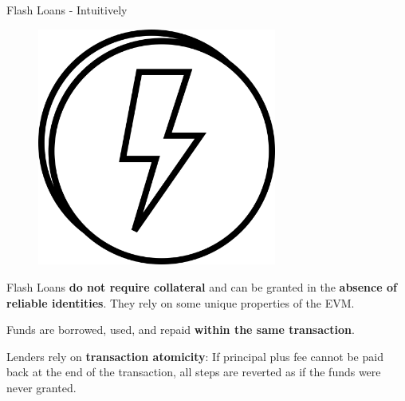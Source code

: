 \documentclass[handout]{beamer}
\begin{document}
\begin{frame}{Flash Loans - Intuitively}

\begin{minipage}{0.3\textwidth}
	\begin{figure}
		\includegraphics[width=0.7\textwidth]{../assets/images/flashloan}	
	\end{figure}
\end{minipage}
\begin{minipage}{0.65\textwidth}
Flash Loans \textbf{do not require collateral} and can be granted in the \textbf{absence of reliable identities}. They rely on some unique properties of the EVM.
\end{minipage}

\vspace{2em}

 {
\begin{minipage}{0.6\textwidth}

	Funds are borrowed, used, and repaid \textbf{within the same transaction}.

	\vspace{1em}
	Lenders rely on \textbf{transaction atomicity}: If principal plus fee cannot be paid back at the end of the transaction, all steps are reverted as if the funds were never granted.
	
\end{minipage}
\begin{minipage}{0.38\textwidth}
	\begin{figure}
		\begin{tikzpicture}[scale=0.8, every node/.style={scale=0.8}]
			
		\end{tikzpicture}	
	\end{figure}
\end{minipage}
}
\vspace{0.5em}


\end{frame}
\end{document}
